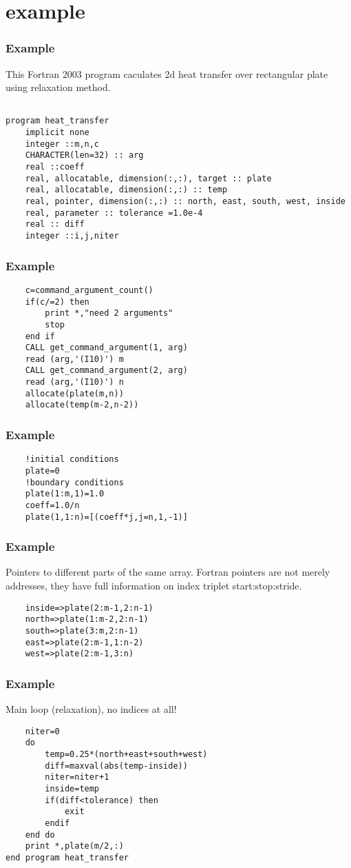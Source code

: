 \documentclass{beamer}
\begin{document}
\section {example}
\begin {frame} [fragile] 
\frametitle {Example}
    This Fortran 2003 program caculates  2d heat transfer over rectangular plate
    using relaxation method.
\begin{verbatim}

program heat_transfer
    implicit none
    integer ::m,n,c
    CHARACTER(len=32) :: arg
    real ::coeff
    real, allocatable, dimension(:,:), target :: plate
    real, allocatable, dimension(:,:) :: temp
    real, pointer, dimension(:,:) :: north, east, south, west, inside
    real, parameter :: tolerance =1.0e-4    
    real :: diff
    integer ::i,j,niter

\end{verbatim}
\end{frame}

\begin {frame} [fragile]
\frametitle {Example}
\begin{verbatim}
    c=command_argument_count()
    if(c/=2) then
        print *,"need 2 arguments"
        stop
    end if    
    CALL get_command_argument(1, arg)
    read (arg,'(I10)') m
    CALL get_command_argument(2, arg)
    read (arg,'(I10)') n
    allocate(plate(m,n))
    allocate(temp(m-2,n-2))
\end{verbatim}
\end{frame}
\begin {frame} [fragile]
\frametitle {Example}
\begin{verbatim}
    !initial conditions
    plate=0
    !boundary conditions
    plate(1:m,1)=1.0
    coeff=1.0/n
    plate(1,1:n)=[(coeff*j,j=n,1,-1)]
\end{verbatim}
\end{frame}

\begin{frame} [fragile]
\frametitle {Example}
    Pointers to different parts of the same array.
    Fortran pointers are not merely addresses, they
    have full information on index triplet start:stop:stride.
\begin{verbatim}
    inside=>plate(2:m-1,2:n-1)
    north=>plate(1:m-2,2:n-1)
    south=>plate(3:m,2:n-1)
    east=>plate(2:m-1,1:n-2)
    west=>plate(2:m-1,3:n)
\end{verbatim}
\end{frame}

\begin{frame} [fragile]
\frametitle {Example}
    Main loop (relaxation), no indices at all!
\begin{verbatim}
    niter=0
    do
        temp=0.25*(north+east+south+west)
        diff=maxval(abs(temp-inside))
        niter=niter+1
        inside=temp
        if(diff<tolerance) then
            exit
        endif
    end do
    print *,plate(m/2,:)
end program heat_transfer
\end{verbatim}
\end{frame}
\end{document}
